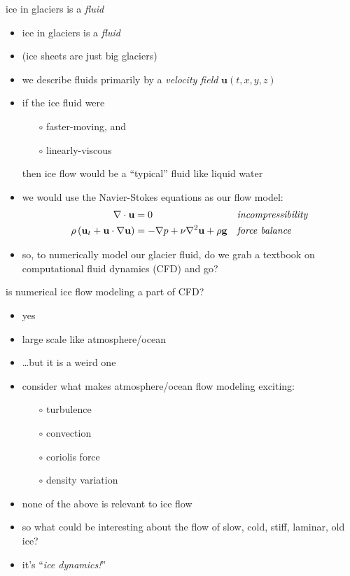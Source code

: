 \documentclass[hide notes,intlimits]{beamer}
\begin{document}
\begin{frame}{ice in glaciers is a \emph{fluid}}

\begin{itemize}
\item ice in glaciers is a \emph{fluid}
\item (ice sheets are just big glaciers)
\item we describe fluids primarily by a \emph{velocity field} $\mathbf{u}(t,x,y,z)$
\item if the ice fluid were
  \begin{itemize}
  \item[$\circ$] faster-moving, and
  \item[$\circ$] linearly-viscous
  \end{itemize}
  
  then ice flow would be a ``typical'' fluid like liquid water
\item we would use the Navier-Stokes equations as our flow model:
\begin{align*}
\nabla \cdot \mathbf{u} &= 0 &&\text{\emph{incompressibility}} \\
\rho \left(\mathbf{u}_t + \mathbf{u}\cdot\nabla \mathbf{u}\right) &= -\nabla p + \nu \nabla^2 \mathbf{u} + \rho \mathbf{g} &&\text{\emph{force balance}}
\end{align*}
\item so, to numerically model our glacier fluid, do we grab a textbook on computational fluid dynamics (CFD) and go?
\end{itemize}
\end{frame}


\begin{frame}{is numerical ice flow modeling a part of CFD?}

\begin{itemize}
\item \alert{yes}
\item large scale like atmosphere/ocean
\item \dots but it is a weird one
\item consider what makes atmosphere/ocean flow modeling exciting:
  \begin{itemize}
  \item[$\circ$] turbulence
  \item[$\circ$] convection
  \item[$\circ$] coriolis force
  \item[$\circ$] density variation
  \end{itemize}
\item none of the above is relevant to ice flow
\item so what could be interesting about the flow of slow, cold, stiff, laminar, old ice?
\item it's ``\emph{ice dynamics!}''
\end{itemize}
\end{frame}
\end{document}
